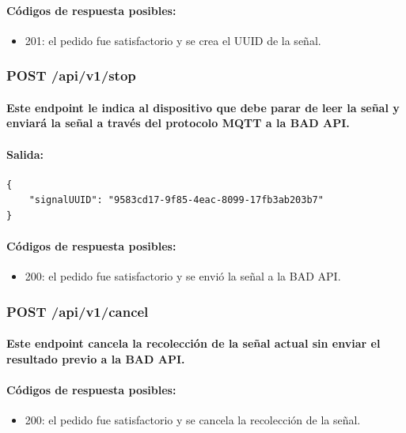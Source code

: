 \documentclass{article}
\begin{document}
\paragraph{
Códigos de respuesta posibles:
}
\begin{itemize}
    \item 201: el pedido fue satisfactorio y se crea el UUID de la señal.
\end{itemize}

\subsubsection{POST /api/v1/stop}
\paragraph{
Este endpoint le indica al dispositivo que debe parar de leer la señal y enviará la señal a través del protocolo MQTT a la BAD API.
}
\paragraph{
Salida:
}

\begin{verbatim}
{
    "signalUUID": "9583cd17-9f85-4eac-8099-17fb3ab203b7"
}
\end{verbatim}

\paragraph{
Códigos de respuesta posibles:
}
\begin{itemize}
    \item 200: el pedido fue satisfactorio y se envió la señal a la BAD API.
\end{itemize}

\subsubsection{POST /api/v1/cancel}
\paragraph{
Este endpoint cancela la recolección de la señal actual sin enviar el resultado previo a la BAD API.
}
\paragraph{
Códigos de respuesta posibles:
}
\begin{itemize}
    \item 200: el pedido fue satisfactorio y se cancela la recolección de la señal.
\end{itemize}
\end{document}
